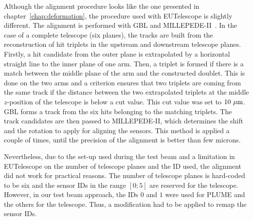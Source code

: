    Although the alignment procedure looks like the one presented in chapter~\ref{chap:deformation}, the procedure used with EUTelescope is slightly different.
    The alignment is performed with \gls{GBL} and MILLEPEDE-II~\cite{MPII}.
    In the case of a complete telescope (six planes), the tracks are built from the reconstruction of hit triplets in the upstream and downstream telescope planes.
    Firstly, a hit candidate from the outer plane is extrapolated by a horizontal straight line to the inner plane of one arm.
    Then, a triplet is formed if there is a match between the middle plane of the arm and the constructed doublet.
    This is done on the two arms and a criterion ensures that two triplets are coming from the same track if the distance between the two extrapolated triplets at the middle $z$-position of the telescope is below a cut value.
    This cut value was set to $10~\rm{\mu m}$.
    \gls{GBL} forms a track from the six hits belonging to the matching triplets.
    The track candidates are then passed to MILLEPEDE-II, which determines the shift and the rotation to apply for aligning the sensors.
    This method is applied a couple of times, until the precision of the alignment is better than few microns.

    Nevertheless, due to the set-up used during the test beam and a limitation in EUTelescope on the number of telescope planes and the ID used, the alignment did not work for practical reasons.
    The number of telescope planes is hard-coded to be six and the sensor IDs in the range $[0; 5]$ are reserved for the telescope. 
    However, in our test beam approach, the IDs $0$ and $1$ were used for \gls{PLUME} and the others for the telescope.
    Thus, a modification had to be applied to remap the sensor IDs. 
      

